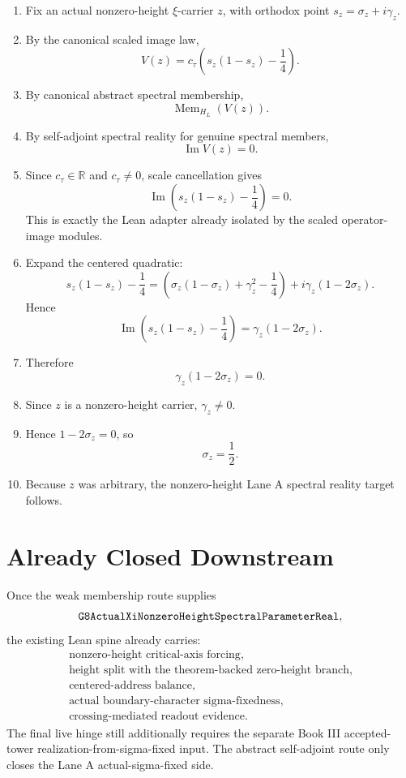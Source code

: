 \documentclass[11pt]{article}
\newcommand{\im}{\operatorname{Im}}
\newcommand{\Mem}{\operatorname{Mem}}
\begin{document}
\begin{enumerate}
\item Fix an actual nonzero-height \(\xi\)-carrier \(z\), with orthodox point
  \(s_z=\sigma_z+i\gamma_z\).

\item By the canonical scaled image law,
  \[
    V(z)=c_\tau\left(s_z(1-s_z)-\frac14\right).
  \]

\item By canonical abstract spectral membership,
  \[
    \Mem_{H_L}(V(z)).
  \]

\item By self-adjoint spectral reality for genuine spectral members,
  \[
    \im V(z)=0.
  \]

\item Since \(c_\tau\in\mathbb{R}\) and \(c_\tau\ne0\), scale cancellation gives
  \[
    \im\left(s_z(1-s_z)-\frac14\right)=0.
  \]
  This is exactly the Lean adapter already isolated by the scaled
  operator-image modules.

\item Expand the centered quadratic:
  \[
    s_z(1-s_z)-\frac14
    =
    \left(\sigma_z(1-\sigma_z)+\gamma_z^2-\frac14\right)
    +i\gamma_z(1-2\sigma_z).
  \]
  Hence
  \[
    \im\left(s_z(1-s_z)-\frac14\right)
    =
    \gamma_z(1-2\sigma_z).
  \]

\item Therefore
  \[
    \gamma_z(1-2\sigma_z)=0.
  \]

\item Since \(z\) is a nonzero-height carrier, \(\gamma_z\ne0\).

\item Hence \(1-2\sigma_z=0\), so
  \[
    \sigma_z=\frac12.
  \]

\item Because \(z\) was arbitrary, the nonzero-height Lane A spectral reality
  target follows.
\end{enumerate}

\section*{Already Closed Downstream}

Once the weak membership route supplies
\[
  \verb|G8ActualXiNonzeroHeightSpectralParameterReal|,
\]
the existing Lean spine already carries:
\[
\begin{gathered}
  \text{nonzero-height critical-axis forcing},\\
  \text{height split with the theorem-backed zero-height branch},\\
  \text{centered-address balance},\\
  \text{actual boundary-character sigma-fixedness},\\
  \text{crossing-mediated readout evidence}.
\end{gathered}
\]
The final live hinge still additionally requires the separate Book III
accepted-tower realization-from-sigma-fixed input.  The abstract self-adjoint
route only closes the Lane A actual-sigma-fixed side.
\end{document}
